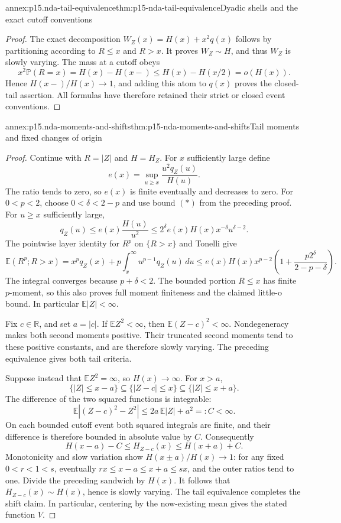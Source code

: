 \begin{annexitem}{annex:p15.nda-tail-equivalence}{thm:p15-nda-tail-equivalence}{Dyadic shells and the exact cutoff conventions}
\begin{proof}
The exact decomposition
\(W_Z(x)=H(x)+x^2q(x)\) follows by partitioning according
to \(R\leq x\) and \(R>x\). It proves \(W_Z\sim H\),
and thus \(W_Z\) is slowly varying.
The mass at a cutoff obeys
\[
 x^2\mathbb P(R=x)=H(x)-H(x-)
                      \leq H(x)-H(x/2)=o(H(x)).
 \]
Hence \(H(x-)/H(x)\to1\), and adding this atom to \(q(x)\)
proves the closed-tail assertion. All formulas have therefore
retained their strict or closed event conventions.
\end{proof}
\end{annexitem}

\begin{annexitem}{annex:p15.nda-moments-and-shifts}{thm:p15-nda-moments-and-shifts}{Tail moments and fixed changes of origin}
\begin{proof}
Continue with \(R=|Z|\) and \(H=H_Z\).
For \(x\) sufficiently large define
\[
 e(x)=\sup_{u\geq x}\frac{u^2q_Z(u)}{H(u)}.
 \]
The ratio tends to zero, so \(e(x)\) is finite eventually and
decreases to zero. For \(0<p<2\), choose
\(0<\delta<2-p\) and use bound \((*)\) from the preceding proof.
For \(u\geq x\) sufficiently large,
\[
 q_Z(u)\leq e(x)\frac{H(u)}{u^2}
 \leq2^\delta e(x)H(x)x^{-\delta}u^{\delta-2}.
 \]
The pointwise layer identity for \(R^p\) on \(\{R>x\}\)
and Tonelli give
\[
 \mathbb E(R^p;R>x)
 =x^p q_Z(x)+p\int_x^\infty u^{p-1}q_Z(u)\,du
 \leq e(x)H(x)x^{p-2}
       \left(1+\frac{p2^\delta}{2-p-\delta}\right).
 \]
The integral converges because \(p+\delta<2\).
The bounded portion \(R\leq x\) has finite \(p\)-moment, so this
also proves full moment finiteness and the claimed little-o bound.
In particular \(\mathbb E|Z|<\infty\).

Fix \(c\in\mathbb R\), and set \(a=|c|\).
If \(\mathbb EZ^2<\infty\), then \(\mathbb E(Z-c)^2<\infty\).
Nondegeneracy makes both second moments positive.
Their truncated second moments tend to these positive constants,
and are therefore slowly varying. The preceding equivalence
gives both tail criteria.

Suppose instead that \(\mathbb EZ^2=\infty\), so \(H(x)\to\infty\).
For \(x>a\),
\[
 \{|Z|\leq x-a\}\subseteq\{|Z-c|\leq x\}
                     \subseteq\{|Z|\leq x+a\}.
 \]
The difference of the two squared functions is integrable:
\[
 \mathbb E\left|(Z-c)^2-Z^2\right|
 \leq2a\,\mathbb E|Z|+a^2=:C<\infty.
 \]
On each bounded cutoff event both squared integrals are finite,
and their difference is therefore bounded in absolute value by \(C\).
Consequently
\[
 H(x-a)-C\leq H_{Z-c}(x)\leq H(x+a)+C.
 \]
Monotonicity and slow variation show
\(H(x\pm a)/H(x)\to1\): for any fixed \(0<r<1<s\),
eventually \(rx\leq x-a\leq x+a\leq sx\), and the outer
ratios tend to one. Divide the preceding sandwich by \(H(x)\).
It follows that \(H_{Z-c}(x)\sim H(x)\), hence is slowly varying.
The tail equivalence completes the shift claim. In particular,
centering by the now-existing mean gives the stated function \(V\).
\end{proof}
\end{annexitem}

